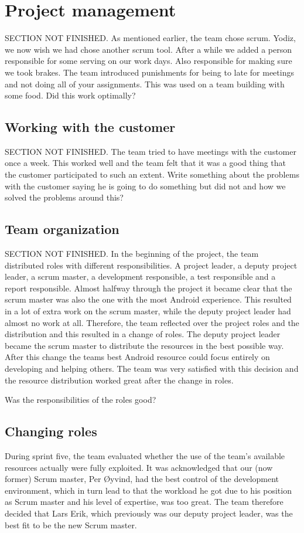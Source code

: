 \section{Project management}
SECTION NOT FINISHED. As mentioned earlier, the team chose scrum. Yodiz, we now wish we had chose another scrum tool. After a while we added a person responsible for some serving on our work days. Also responsible for making sure we took brakes. 
The team introduced punishments for being to late for meetings and not doing all of your assignments. This was used on a team building with some food. Did this work optimally?
\subsection{Working with the customer}
SECTION NOT FINISHED. The team tried to have meetings with the customer once a week. This worked well and the team felt that it was a good thing that the customer participated to such an extent. Write something about the problems with the customer saying he is going to do something but did not and how we solved the problems around this?

\subsection{Team organization}
SECTION NOT FINISHED.
In the beginning of the project, the team distributed roles with different responsibilities. A project leader, a deputy project leader, a scrum master, a development responsible, a test responsible and a report responsible. Almost halfway through the project it became clear that the scrum master was also the one with the most Android experience. This resulted in a lot of extra work on the scrum master, while the deputy project leader had almost no work at all. Therefore, the team reflected over the project roles and the distribution and this resulted in a change of roles. The deputy project leader became the scrum master to distribute the resources in the best possible way. After this change the teams best Android resource could focus entirely on developing and helping others. The team was very satisfied with this decision and the resource distribution worked great after the change in roles. 

Was the responsibilities of the roles good?

\subsection{Changing roles}
\label{sec:unbalancedWorkload}
During sprint five, the team evaluated whether the use of the team's available resources actually were fully exploited. It was acknowledged that our (now former) Scrum master, Per Øyvind, had the best control of the development environment, which in turn lead to that the workload he got due to his position as Scrum master and his level of expertise, was too great. The team therefore decided that Lars Erik, which previously was our deputy project leader, was the best fit to be the new Scrum master.


